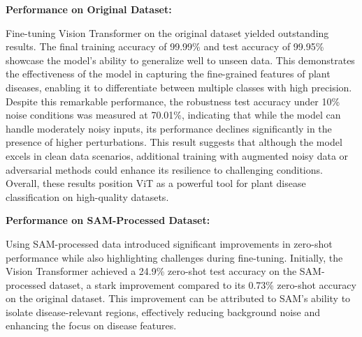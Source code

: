\documentclass{article}
\begin{document}
\textbf{Performance on Original Dataset:}

\begin{table}[h!]
\centering
{}
\captionsetup{font=small}
\caption{Performance Metrics of Vision Transformer (ViT) on the Original Dataset}
\label{tab:vit_metrics_original}
\end{table}

Fine-tuning Vision Transformer on the original dataset yielded outstanding results. The final training accuracy of 99.99\% and test accuracy of 99.95\% showcase the model's ability to generalize well to unseen data. This demonstrates the effectiveness of the model in capturing the fine-grained features of plant diseases, enabling it to differentiate between multiple classes with high precision. Despite this remarkable performance, the robustness test accuracy under 10\% noise conditions was measured at 70.01\%, indicating that while the model can handle moderately noisy inputs, its performance declines significantly in the presence of higher perturbations. This result suggests that although the model excels in clean data scenarios, additional training with augmented noisy data or adversarial methods could enhance its resilience to challenging conditions. Overall, these results position ViT as a powerful tool for plant disease classification on high-quality datasets.

\textbf{Performance on SAM-Processed Dataset:}

Using SAM-processed data introduced significant improvements in zero-shot performance while also highlighting challenges during fine-tuning. Initially, the Vision Transformer achieved a 24.9\% zero-shot test accuracy on the SAM-processed dataset, a stark improvement compared to its 0.73\% zero-shot accuracy on the original dataset. This improvement can be attributed to SAM's ability to isolate disease-relevant regions, effectively reducing background noise and enhancing the focus on disease features.

\begin{table}[h!]
\centering
{}
\captionsetup{font=small}
\caption{Performance Metrics of Vision Transformer (ViT) on SAM-Processed Dataset}
\label{tab:vit_metrics_sam}
\end{table}
\end{document}
